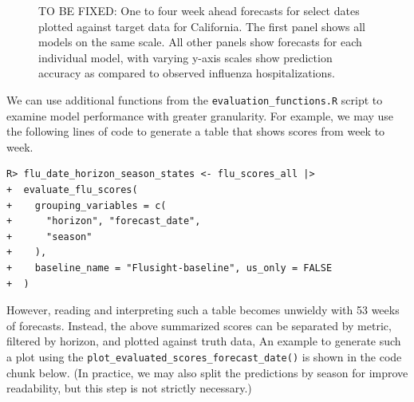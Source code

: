 \documentclass[
  article,
  shortnames,
  notitle]{jss}
\begin{document}
\begin{figure}[H]


\caption{\label{fig-plot-forecasts-hubVis}TO BE FIXED: One to four week
ahead forecasts for select dates plotted against target data for
California. The first panel shows all models on the same scale. All
other panels show forecasts for each individual model, with varying
y-axis scales show prediction accuracy as compared to observed influenza
hospitalizations.}

\end{figure}%

We can use additional functions from the
\texttt{evaluation\_functions.R} script to examine model performance
with greater granularity. For example, we may use the following lines of
code to generate a table that shows scores from week to week.

\begin{verbatim}
R> flu_date_horizon_season_states <- flu_scores_all |>
+  evaluate_flu_scores(
+    grouping_variables = c(
+      "horizon", "forecast_date",
+      "season"
+    ),
+    baseline_name = "Flusight-baseline", us_only = FALSE
+  )
\end{verbatim}

However, reading and interpreting such a table becomes unwieldy with 53
weeks of forecasts. Instead, the above summarized scores can be
separated by metric, filtered by horizon, and plotted against truth
data, An example to generate such a plot using the
\texttt{plot\_evaluated\_scores\_forecast\_date()} is shown in the code
chunk below. (In practice, we may also split the predictions by season
for improve readability, but this step is not strictly necessary.)
\end{document}
